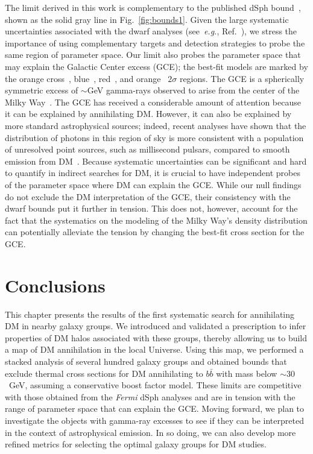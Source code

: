 The limit derived in this work is complementary to the published dSph bound~\cite{Ackermann:2015zua,Fermi-LAT:2016uux}, shown as the solid gray line in Fig.~\ref{fig:bounds1}. Given the large systematic uncertainties associated with the dwarf analyses (see~\emph{e.g.}, Ref.~\cite{Geringer-Sameth:2014qqa}), we stress the importance of using complementary targets and detection strategies to probe the same region of parameter space. Our limit also probes the parameter space that may explain the Galactic Center excess (GCE); the best-fit models are marked by the orange cross~\cite{Abazajian:2014fta}, blue~\cite{Calore:2014xka}, red~\cite{Gordon:2013vta}, and orange~\cite{Daylan:2014rsa} $2$$\sigma$ regions.  The GCE is a spherically symmetric excess of $\sim$GeV gamma-rays observed to arise from the center of the Milky Way~\cite{Goodenough:2009gk,Hooper:2010mq,TheFermi-LAT:2015kwa,Karwin:2016tsw}.  The GCE has received a considerable amount of attention because it can be explained by annihilating DM.  However, it can also be explained by more standard astrophysical sources; indeed, recent analyses have shown that the distribution of photons in this region of sky is more consistent with a population of unresolved point sources, such as millisecond pulsars, compared to smooth emission from DM~\cite{Lee:2015fea, Bartels:2015aea,Linden:2016rcf, FermiLAT:2017yoi}.  Because systematic uncertainties can be significant and hard to quantify in indirect searches for DM, it is crucial to have independent probes of the parameter space where DM can explain the GCE.  While our null findings do not exclude the DM interpretation of the GCE, their consistency with the dwarf bounds put it further in tension.  This does not, however, account for the fact that the systematics on the modeling of the Milky Way's density distribution can potentially alleviate the tension by changing the best-fit cross section for the GCE.   

\section{Conclusions}

This chapter presents the results of the first systematic search for annihilating DM in nearby galaxy groups.  We introduced and validated  a prescription to infer properties of DM halos associated with  these groups, thereby allowing us to build a map of DM annihilation in the local Universe.  Using this map, we performed a stacked analysis of several hundred galaxy groups and obtained bounds that exclude thermal cross sections for DM  annihilating to $b \bar b$ with mass below $\sim$$30$~GeV, assuming a conservative boost factor model.  These limits are competitive with those obtained from the \emph{Fermi} dSph analyses and are in tension with the range of parameter space that can explain the GCE.  Moving forward, we plan to investigate the objects with gamma-ray excesses to see if they can be interpreted in the context of astrophysical emission.  In so doing, we can also develop more refined metrics for selecting the optimal galaxy groups for DM studies.    

